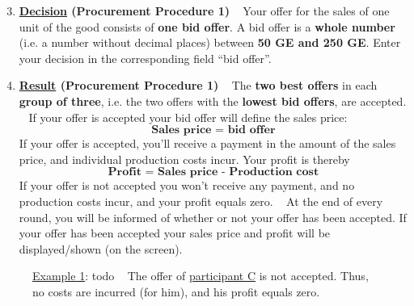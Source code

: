 \documentclass[11pt]{article}
\begin{document}
\begin{enumerate}[label=\textbf{\upshape(\arabic*\upshape)}] \setcounter{enumi}{2}
	\item \textbf{\underline{Decision} (Procurement Procedure 1)} ~\smallbreak
		Your offer for the sales of one unit of the good consists of \textbf{one bid offer}. A bid offer is a \textbf{whole number} (i.e. a number without decimal places) between \textbf{50 GE and 250 GE}. Enter your decision in the corresponding field \enquote{bid offer}.
	\item \textbf{\underline{Result} (Procurement Procedure 1)} ~\smallbreak
		The \textbf{two best offers} in each \textbf{group of three}, i.e. the two offers with the \textbf{lowest bid offers}, are accepted. ~\smallbreak
		If your offer is accepted your bid offer will define the sales price:
			$$ \textbf{Sales price = bid offer} $$
		If your offer is accepted, you’ll receive a payment in the amount of the sales price, and individual production costs incur. Your profit is thereby
			$$ \textbf{Profit = Sales price - Production cost} $$
		If your offer is not accepted you won’t receive any payment, and no production costs incur, and your profit equals zero. ~\smallbreak
		At the end of every round, you will be informed of whether or not your offer has been accepted. If your offer has been accepted your sales price and profit will be displayed/shown (on the screen).
\end{enumerate}


\begin{figure}[h!] 
	\begin{minipage}[t]{1\linewidth} 
		\begin{tcolorbox}[colback=pink,arc=0pt,colframe=black!25]
			\underline{Example 1}: todo ~\bigbreak 
			\vspace{4cm}
			The offer of \underline{participant C} is not accepted. Thus, no costs are incurred (for him), and his profit equals zero.      
		\end{tcolorbox} 
	\end{minipage}  
\end{figure}



\end{document}
